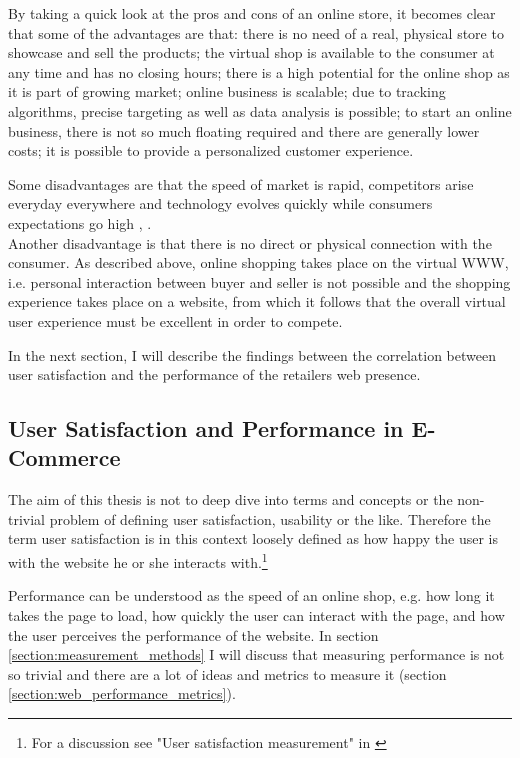 By taking a quick look at the pros and cons of an online store, it becomes clear that some of the advantages are that: there is no need of a real, physical store to showcase and sell the products; the virtual shop is available to the consumer at any time and has no closing hours; there is a high potential for the online shop as it is part of growing market; online business is scalable; due to tracking algorithms, precise targeting as well as data analysis is possible; to start an online business, there is not so much floating required and there are generally lower costs; it is possible to provide a personalized customer experience.

Some disadvantages are that the speed of market is rapid, competitors arise everyday everywhere and technology evolves quickly while consumers expectations go high \cite{2019Hermogeno}, \cite{2020Lang}.
\\


Another disadvantage is that there is no direct or physical connection with the consumer.
As described above, online shopping takes place on the virtual WWW, i.e. personal interaction between buyer and seller is not possible and the shopping experience takes place on a website, from which it follows that the overall virtual user experience must be excellent in order to compete.

In the next section, I will describe the findings between the correlation between user satisfaction and the performance of the retailers web presence.




\subsection{User Satisfaction and Performance in E-Commerce} %
\label{subsection:user_satisfaction}


The aim of this thesis is not to deep dive into terms and concepts or the non-trivial problem of defining user satisfaction, usability or the like.
Therefore the term user satisfaction is in this context loosely defined as how happy the user is with the website he or she interacts with.\footnote{For a discussion see "User satisfaction measurement" in \cite{2010Islam}}


Performance can be understood as the speed of an online shop, e.g. how long it takes the page to load, how quickly the user can interact with the page, and how the user perceives the performance of the website.
In section \ref{section:measurement_methods} I will discuss that measuring performance is not so trivial and there are a lot of ideas and metrics to measure it (section \ref{section:web_performance_metrics}).


